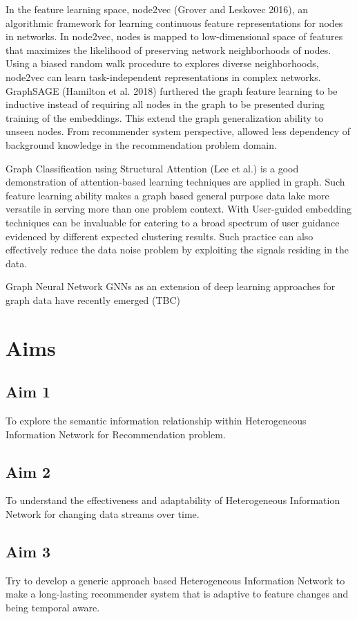 \documentclass[12pt,a4 paper,title page]{article}
\begin{document}
In the feature learning space, node2vec (Grover and Leskovec 2016), an algorithmic framework for learning continuous feature representations for nodes in networks. In node2vec, nodes is mapped to low-dimensional space of features that maximizes the likelihood of preserving network neighborhoods of nodes. Using a biased random walk procedure to explores diverse neighborhoods, node2vec can learn task-independent representations in complex networks. GraphSAGE (Hamilton et al. 2018) furthered the graph feature learning to be inductive instead of requiring all nodes in the graph to be presented during training of the embeddings. This extend the graph generalization ability to unseen nodes. From recommender system perspective, allowed less dependency of background knowledge in the recommendation problem domain.  

Graph Classification using Structural Attention (Lee et al.) is a good demonstration of attention-based learning techniques are applied in graph. Such feature learning ability makes a graph based general purpose data lake more versatile in serving more than one problem context. With User-guided embedding techniques can be invaluable for catering to a broad spectrum of user guidance evidenced by different expected clustering results. Such practice can also effectively reduce the data noise problem by exploiting the signals residing in the data.  

Graph Neural Network GNNs as an extension of deep learning approaches for graph data have recently emerged (TBC)

\section{Aims}
\subsection{Aim 1}
To explore the semantic information relationship within Heterogeneous Information Network for Recommendation problem.

\subsection{Aim 2}
To understand the effectiveness and adaptability of Heterogeneous Information Network for changing data streams over time. 

\subsection{Aim 3}
Try to develop a generic approach based Heterogeneous Information Network to make a long-lasting recommender system that is adaptive to feature changes and being temporal aware. 
\end{document}
